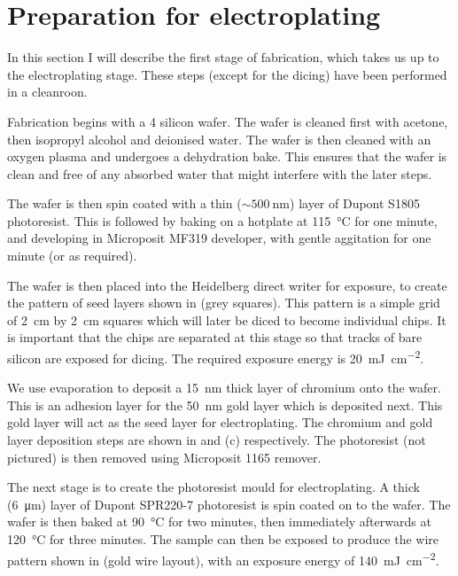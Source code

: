 
\section{Preparation for electroplating}
\label{fab:prep}

In this section I will describe the first stage of fabrication, which takes us
up to the electroplating stage. These steps (except for the dicing) have been
performed in a cleanroon.

Fabrication begins with a \SI{4}{\inch} silicon wafer. The wafer is cleaned first
with acetone, then isopropyl alcohol and deionised water. The wafer is then
cleaned with an oxygen plasma and undergoes a dehydration bake.  This ensures
that the wafer is clean and free of any absorbed water that might
interfere with the later steps.

The wafer is then spin coated with a thin ($\sim\SI{500}{\nano\meter}$) layer
of Dupont S1805 photoresist. This is followed by baking on a hotplate at
\SI{115}{\celsius} for one minute, and developing in Microposit MF319
developer, with gentle aggitation for one minute (or as required).

The wafer is then placed into the Heidelberg direct writer for exposure, to
create the pattern of seed layers shown in  (grey
squares). This pattern is a simple grid of \SI{2}{\centi\meter} by
\SI{2}{\centi\meter} squares which will later be diced to become individual
chips.  It is important that the chips are separated at this stage so that
tracks of bare silicon are exposed for dicing. The required exposure energy is
\SI{20}{\milli\joule\per\centi\meter\squared}.

We use evaporation to deposit a \SI{15}{\nano\meter} thick layer of chromium onto the
wafer. This is an adhesion layer for the \SI{50}{\nano\meter} gold layer which is
deposited next. This gold layer will act as the seed layer for electroplating.
The chromium and gold layer deposition steps are shown in
 and (c) respectively. The photoresist (not
pictured) is then removed using Microposit 1165 remover.

The next stage is to create the photoresist mould for electroplating. A thick
(\SI{6}{\micro\meter}) layer of Dupont SPR220-7 photoresist is spin coated on to the
wafer. The wafer is then baked at \SI{90}{\celsius} for two minutes, then
immediately afterwards at \SI{120}{\celsius} for three minutes. The sample can
then be exposed to produce the wire pattern shown in
 (gold wire layout), with an exposure
energy of \SI{140}{\milli\joule\per\centi\meter\squared}.

